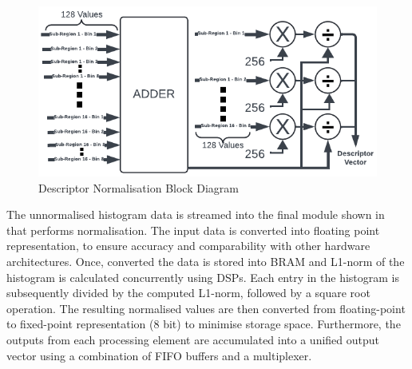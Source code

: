 \begin{figure}[h]
    \centering
     \includegraphics[width=0.8\columnwidth]{Images/Descriptor Gen.png}
    \caption{Descriptor Normalisation Block Diagram}
    \label{fig:Descriptorgenblock}
\end{figure}

The unnormalised histogram data is streamed into the final module shown in  that performs normalisation. The input data is converted into floating point representation, to ensure accuracy and comparability with other hardware architectures. Once, converted the data is stored into BRAM and L1-norm of the histogram is calculated concurrently using DSPs. Each entry in the histogram is subsequently divided by the computed L1-norm, followed by a square root operation. The resulting normalised values are then converted from floating-point to fixed-point representation (8 bit) to minimise storage space. Furthermore, the outputs from each processing element are accumulated into a unified output vector using a combination of FIFO buffers and a multiplexer.



